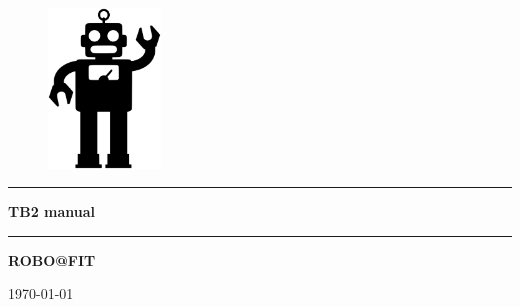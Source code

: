 \documentclass[12pt,a4paper,titlepage]{article}
\numberwithin{equation}{subsection}
\begin{document}

\begin{titlepage}

\begin{center}

 \begin{figure}
	\centering\includegraphics[width=3cm]{./img/robot.pdf}
 \end{figure}
 
\vspace*{100pt}

\rule{\linewidth}{0.5mm}

{ \vspace{15pt} \huge \bfseries TB2 manual}
\vspace{15pt}
\rule{\linewidth}{0.5mm}

\vspace{50pt}

\textsc{\Large \bfseries ROBO@FIT}


\vspace{30pt}
\large \today


\end{center}

\end{titlepage}
\end{document}
